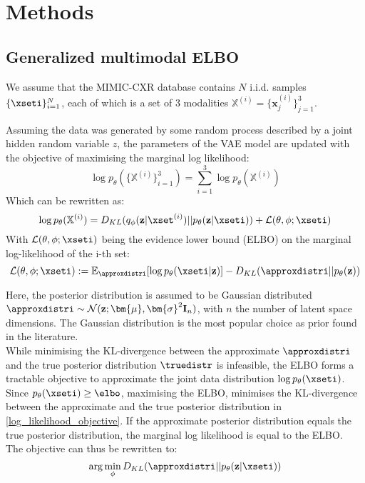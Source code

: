 \section{Methods}

\subsection{Generalized multimodal ELBO}

We assume that the MIMIC-CXR database contains $N$ i.i.d. samples $\{\xseti\}^N_{i=1}$, each of which is a set of 3 modalities $\mathbb{X}^{(i)} = \{\textbf{x}_j^{(i)}\}^3_{j=1}$.

Assuming the data was generated by some random process described by a joint hidden random variable $z$, the parameters of the VAE model are updated with the objective of maximising the marginal log likelihood:
\begin{equation}
    \log p_{\theta}(\{\mathbb{X}^{(i)}\}_{i=1}^3) = \sum _{i=1}^3 \log p_{\theta}(\mathbb{X}^{(i)})
\end{equation}
Which can be rewritten as:
\begin{equation}
    \label{log_likelihood_objective}
    \log p_{\theta}(\mathbb{X}^{(i)}) = D_{KL}(q_{\phi}(\textbf{z}|\xset^{(i)})||p_{\theta}(\textbf{z}|\xseti)) + \mathcal{L}(\theta, \phi; \xseti)
\end{equation}
With $\mathcal{L}(\theta, \phi; \xseti)$ being the evidence lower bound (ELBO) on the marginal log-likelihood of the i-th set:
\begin{equation}
    \mathcal{L}(\theta, \phi; \xseti) := \mathbb{E}_{\approxdistri}[\log p_{\theta}(\xseti|\textbf{z})] - D_{KL}(\approxdistri||p_{\theta}(\textbf{z}))
\end{equation}

Here, the posterior distribution is assumed to be Gaussian distributed $\approxdistri \sim \mathcal{N}(\textbf{z}; \bm{\mu}, \bm{\sigma}^2\textbf{I}_n)$, with $n$ the number of latent space dimensions.
The Gaussian distribution is the most popular choice as prior found in the literature.\\
While minimising the KL-divergence between the approximate $\approxdistri$ and the true posterior distribution $\truedistr$ is infeasible, the ELBO forms a tractable objective to approximate the joint data distribution $\log p_{\theta}(\xseti)$.
Since $p_{\theta}(\xseti) \geq \elbo$, maximising the ELBO, minimises the KL-divergence between the approximate and the true posterior distribution in \cref{log_likelihood_objective}.
If the approximate posterior distribution equals the true posterior distribution, the marginal log likelihood is equal to the ELBO.\\
The objective can thus be rewritten to:
\begin{equation}
    \arg \min _{\phi} D_{KL}(\approxdistri||p_{\theta}(\textbf{z}|\xseti))
\end{equation}

